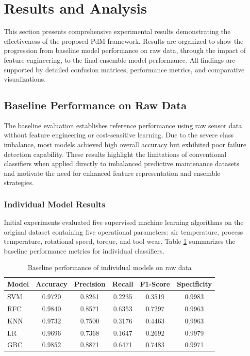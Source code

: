 \documentclass[final,5p, twocolumn]{elsarticle}
\begin{document}
\section{Results and Analysis}

This section presents comprehensive experimental results demonstrating the effectiveness of the proposed PdM framework. Results are organized to show the progression from baseline model performance on raw data, through the impact of feature engineering, to the final ensemble model performance. All findings are supported by detailed confusion matrices, performance metrics, and comparative visualizations.

\subsection{Baseline Performance on Raw Data}
The baseline evaluation establishes reference performance using raw sensor data without feature engineering or cost-sensitive learning. Due to the severe class imbalance, most models achieved high overall accuracy but exhibited poor failure detection capability. These results highlight the limitations of conventional classifiers when applied directly to imbalanced predictive maintenance datasets and motivate the need for enhanced feature representation and ensemble strategies.

\subsubsection{Individual Model Results}

Initial experiments evaluated five supervised machine learning algorithms on the original dataset containing five operational parameters: air temperature, process temperature, rotational speed, torque, and tool wear. Table \ref{tab:baseline_performance} summarizes the baseline performance metrics for individual classifiers.

\begin{table}[htbp]
\centering
\caption{Baseline performance of individual models on raw data}
\label{tab:baseline_performance}
\begin{tabular}{lccccc}
\hline
\textbf{Model} & \textbf{Accuracy} & \textbf{Precision} & \textbf{Recall} & \textbf{F1-Score} & \textbf{Specificity} \\
\hline
SVM & 0.9720 & 0.8261 & 0.2235 & 0.3519 & 0.9983 \\
RFC & 0.9840 & 0.8571 & 0.6353 & 0.7297 & 0.9963 \\
KNN & 0.9732 & 0.7500 & 0.3176 & 0.4463 & 0.9963 \\
LR & 0.9696 & 0.7368 & 0.1647 & 0.2692 & 0.9979 \\
GBC & 0.9852 & 0.8871 & 0.6471 & 0.7483 & 0.9971 \\
\hline
\end{tabular}
\end{table}
\end{document}
